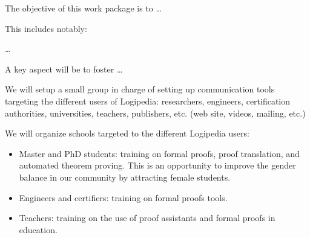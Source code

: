 \begin{workpackage}[id=dissemination,wphases=0-48,type=MGT,
  short=Dissemination,%
  title={Dissemination, communication, and exploitation},
  lead=Inr,
  BolRM=3,
  InrRM=10]
  
\begin{wpobjectives}
  The objective of this work package is to \ldots

This includes notably:
  \begin{compactitem}
  \item \ldots
  \end{compactitem}
  A key aspect will be to foster \ldots
\end{wpobjectives}

\begin{wpdescription}
   
\end{wpdescription}

\begin{tasklist}
  \begin{task}[id=com,title=Communication]
    We will setup a small group in charge of setting up communication
    tools targeting the different users of Logipedia: researchers,
    engineers, certification authorities, universities, teachers,
    publishers, etc. (web site, videos, mailing, etc.)
  \end{task}

  \begin{task}[id=schools,title=Training Logipedia users]
    We will organize schools targeted to the different Logipedia users:
    \begin{itemize}
    \item Master and PhD students: training on formal proofs, proof
      translation, and automated theorem proving. This is an
      opportunity to improve the gender balance in our community by
      attracting female students.
    \item Engineers and certifiers: training on formal proofs tools.
    \item Teachers: training on the use of proof assistants and formal
      proofs in education.
    \end{itemize}
  \end{task}


\end{tasklist}
\end{workpackage}
